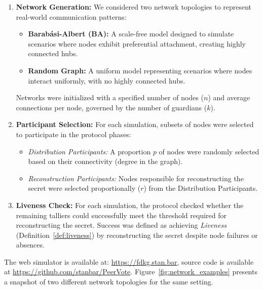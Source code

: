 \documentclass[lettersize,journal]{IEEEtran}
\theoremstyle{definition}
\begin{document}
\begin{enumerate}
    \item \textbf{Network Generation:} We considered two network topologies to represent real-world communication patterns:
    \begin{itemize}
        \item \textbf{Barabási-Albert (BA):} A scale-free model designed to simulate scenarios where nodes exhibit preferential attachment, creating highly connected hubs.
        \item \textbf{Random Graph:} A uniform model representing scenarios where nodes interact uniformly, with no highly connected hubs.
    \end{itemize}
    
    Networks were initialized with a specified number of nodes ($n$) and average connections per node, governed by the number of guardians ($k$). 
    \item \textbf{Participant Selection:} For each simulation, subsets of nodes were selected to participate in the protocol phases:
    \begin{itemize}
        \item \emph{Distribution Participants:} A proportion $p$ of nodes were randomly selected based on their connectivity (degree in the graph).
        \item \emph{Reconstruction Participants:} Nodes responsible for reconstructing the secret were selected proportionally ($r$) from the Distribution Participants.
    \end{itemize}
    
    \item \textbf{Liveness Check:} For each simulation, the protocol checked whether the remaining talliers could successfully meet the threshold required for reconstructing the secret. Success was defined as achieving \emph{Liveness} (Definition~\ref{def:liveness}) by reconstructing the secret despite node failures or absences.
\end{enumerate}

The web simulator is available at: \url{https://fdkg.stan.bar}, source code is available at \url{https://github.com/stanbar/PeerVote}. Figure~\ref{fig:network_examples} presents a snapshot of two different network topologies for the same setting.
\end{document}
